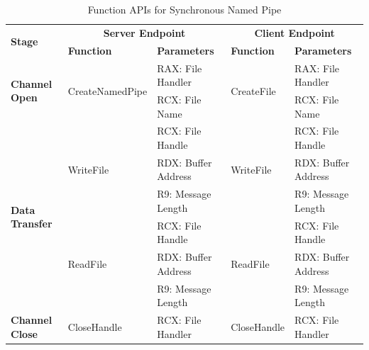     \begin{table}[H]
        \centering
        \caption{Function APIs for Synchronous Named Pipe}
        \label{synfunctions}
        \begin{tabular}{|l|l|l|l|l|}
            \hline
             \multirow{2}{*}{\textbf{Stage}} &
               \multicolumn{2}{c|}{\textbf{Server Endpoint}} &
               \multicolumn{2}{c|}{\textbf{Client Endpoint}} \\
             \cline{2-5}
              & \textbf{Function}& \textbf{Parameters} & \textbf{Function} & \textbf{Parameters}  \\
             \hline
             \multirow{2}{*}{{\textbf{Channel Open}}}
             &\multirow{2}{*}{{CreateNamedPipe}} &  RAX: File Handler & \multirow{2}{*}{CreateFile} &  RAX: File Handler\\
              \cline{3-3} \cline{5-5}
             &&  RCX: File Name &  &  RCX: File Name\\
            \hline
             \multirow{6}{*}{{\textbf{Data Transfer}}}
             &\multirow{3}{*}{WriteFile} &  RCX: File Handle & \multirow{3}{*}{WriteFile} &  RCX: File Handle\\
              \cline{3-3} \cline{5-5}
             &&  RDX: Buffer Address &  &  RDX: Buffer Address\\
                           \cline{3-3} \cline{5-5}
             & &  R9: Message Length &  &  R9: Message Length\\
            \cline{2-5}
             & \multirow{3}{*}{ReadFile}&  RCX: File Handle & \multirow{3}{*}{ReadFile} &  RCX: File Handle\\
              \cline{3-3} \cline{5-5}
              &&  RDX: Buffer Address &  &  RDX: Buffer Address\\
                           \cline{3-3} \cline{5-5}
             & &  R9: Message Length &  &  R9: Message Length\\
            \hline
           {{\textbf{Channel Close}}}
             &{CloseHandle} & {RCX: File Handler} & {CloseHandle} & {RCX: File Handler}\\
            \hline
        \end{tabular}
    \end{table}

